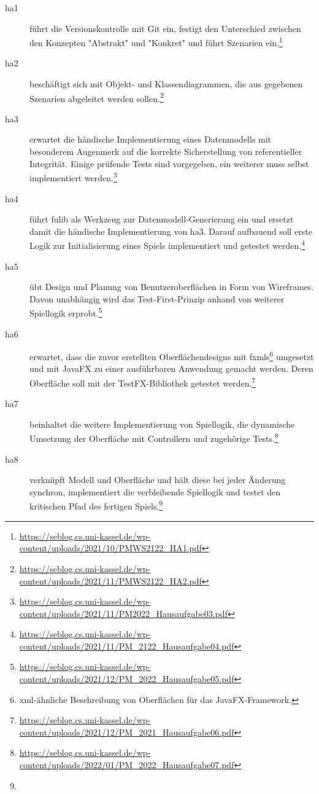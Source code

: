 \begin{description}
    \item[\ac{ha}1] führt die Versionskontrolle mit Git ein, festigt den Unterschied zwischen den Konzepten "Abstrakt" und "Konkret" und führt Szenarien ein.\footnote{
        \url{https://seblog.cs.uni-kassel.de/wp-content/uploads/2021/10/PMWS2122_HA1.pdf}
    }
    \item[\ac{ha}2] beschäftigt sich mit Objekt- und Klassendiagrammen, die aus gegebenen Szenarien abgeleitet werden sollen.\footnote{
        \url{https://seblog.cs.uni-kassel.de/wp-content/uploads/2021/11/PMWS2122_HA2.pdf}
    }
    \item[\ac{ha}3] erwartet die händische Implementierung eines Datenmodells mit besonderem Augenmerk auf die korrekte Sicherstellung von referentieller Integrität.
    Einige prüfende Tests sind vorgegeben, ein weiterer muss selbst implementiert werden.\footnote{
        \url{https://seblog.cs.uni-kassel.de/wp-content/uploads/2021/11/PM2022_Hausaufgabe03.pdf}
    }
    \item[\ac{ha}4] führt fulib als Werkzeug zur Datenmodell-Generierung ein und ersetzt damit die händische Implementierung von \ac{ha}3.
    Darauf aufbauend soll erste Logik zur Initialisierung eines Spiels implementiert und getestet werden.\footnote{
        \url{https://seblog.cs.uni-kassel.de/wp-content/uploads/2021/11/PM_2122_Hausaufgabe04.pdf}
    }
    \item[\ac{ha}5] übt Design und Planung von Benutzeroberflächen in Form von Wireframes.
    Davon unabhängig wird das Test-First-Prinzip anhand von weiterer Spiellogik erprobt.\footnote{
        \url{https://seblog.cs.uni-kassel.de/wp-content/uploads/2021/12/PM_2022_Hausaufgabe05.pdf}
    }
    \item[\ac{ha}6] erwartet, dass die zuvor erstellten Oberflächendesigns mit \acp{fxml}\footnote{
        \ac{xml}-ähnliche Beschreibung von Oberflächen für das JavaFX-Framework.
    } umgesetzt und mit JavaFX zu einer ausführbaren Anwendung gemacht werden.
    Deren Oberfläche soll mit der TestFX-Bibliothek getestet werden.\footnote{
        \url{https://seblog.cs.uni-kassel.de/wp-content/uploads/2021/12/PM_2021_Hausaufgabe06.pdf}
    }
    \item[\ac{ha}7] beinhaltet die weitere Implementierung von Spiellogik, die dynamische Umsetzung der Oberfläche mit Controllern und zugehörige Tests.\footnote{
        \url{https://seblog.cs.uni-kassel.de/wp-content/uploads/2022/01/PM_2022_Hausaufgabe07.pdf}
    }
    \item[\ac{ha}8] verknüpft Modell und Oberfläche und hält diese bei jeder Änderung synchron, implementiert die verbleibende Spiellogik und testet den kritischen Pfad des fertigen Spiels.\footnote{
}
\end{description}
